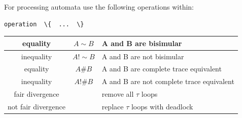 \documentclass[]{article}
\newcounter{dead1}
\newcounter{dead2}
\begin{document}
\vspace{2ex} \noindent For processing automata use the following operations within:

\begin{verbatim}operation  \{  ...  \}\end{verbatim}

\vspace{2ex}
\begin{tabular}{|c|c|l|}\hline
equality   & $A\sim B$  & A and B are bisimular\\ \hline
inequality   & $A!\sim B$  & A and B are not bisimular\\ \hline
equality   & $A\# B$  & A and B are complete trace equivalent\\ \hline
inequality   & $A!\# B$  & A and B are not complete trace equivalent\\ \hline
fair divergence  & & remove all $\tau$ loops \\ \hline
not fair divergence  & & replace $\tau$ loops  with deadlock\\ \hline
\end{tabular}







\end{document}
